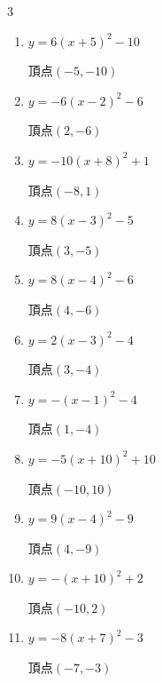 \begin{multicols}{3}
\begin{enumerate}
        $\displaystyle 頂点\left( 9 , -6 \right)$

  \item $\displaystyle y=6\left( x+5\right)^{2}-10$

        $\displaystyle 頂点\left( -5 , -10 \right)$

  \item $\displaystyle y=-6\left( x-2\right)^{2}-6$

        $\displaystyle 頂点\left( 2 , -6 \right)$

  \item $\displaystyle y=-10\left( x+8\right)^{2}+1$

        $\displaystyle 頂点\left( -8 , 1 \right)$

  \item $\displaystyle y=8\left( x-3\right)^{2}-5$

        $\displaystyle 頂点\left( 3 , -5 \right)$

\columnbreak %

  \item $\displaystyle y=8\left( x-4\right)^{2}-6$

        $\displaystyle 頂点\left( 4 , -6 \right)$

  \item $\displaystyle y=2\left( x-3\right)^{2}-4$

        $\displaystyle 頂点\left( 3 , -4 \right)$

  \item $\displaystyle y=-\left( x-1\right)^{2}-4$

        $\displaystyle 頂点\left( 1 , -4 \right)$

  \item $\displaystyle y=-5\left( x+10\right)^{2}+10$

        $\displaystyle 頂点\left( -10 , 10 \right)$

  \item $\displaystyle y=9\left( x-4\right)^{2}-9$

        $\displaystyle 頂点\left( 4 , -9 \right)$

  \item $\displaystyle y=-\left( x+10\right)^{2}+2$

        $\displaystyle 頂点\left( -10 , 2 \right)$

  \item $\displaystyle y=-8\left( x+7\right)^{2}-3$

        $\displaystyle 頂点\left( -7 , -3 \right)$


\end{enumerate}
\end{multicols}
